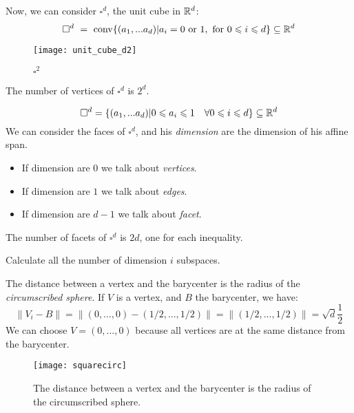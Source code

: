 Now, we can consider $\square^d$, the unit cube in $\mathbb{R}^d$:
\[
   \square^d
   \ = \ 
   \conv\{(a_1,...a_d)|a_i=0\text{ or }1, \text{ for }0\leqslant i\leqslant
   d\}\subseteq\RR^d
\]

\begin{figure}[htbp]
  \centering
  \texttt{[image: unit\_cube\_d2]}
  
  \caption{$\square^2$}
\label{fig:intro:3}
\end{figure}

\begin{obs}
 The number of vertices of $\square^d$ is $2^d$.
\end{obs}

\begin{defn}
 $$\square^d=\left\{(a_1,...a_d)|0\leqslant a_i\leqslant 1 \quad \forall 0\leqslant i\leqslant d\right\}\subseteq\mathbb{R}^d$$
 We can consider the faces of $\square^d$, and his \textit{dimension} are the dimension of his affine span. 
\begin{itemize}
 \item If dimension are $0$ we talk about \textit{vertices}.
 \item If dimension are $1$ we talk about \textit{edges}.
 \item If dimension are $d-1$ we talk about \textit{facet}.
\end{itemize}

\end{defn}

\begin{obs}
 The number of facets of $\square^d$ is $2d$, one for each inequality.
\end{obs}

\begin{exercise}
 Calculate all the number of dimension $i$ subspaces.
\end{exercise}

\begin{obs}
  The distance between a vertex and the barycenter is the radius of the
  \emph{circumscribed sphere}. If $V$ is a vertex, and $B$ the barycenter, we have:
$$\|V_i-B\|=\|(0,...,0)-(1/2,...,1/2)\|=\|(1/2,...,1/2)\|=\sqrt{d}\frac{1}{2}$$
 We can choose $V=(0,...,0)$ because all vertices are at the same distance from the barycenter.

\begin{figure}[htbp]
  \centering
  \texttt{[image: squarecirc]}
  
  \caption{The distance between a vertex and the barycenter is the radius of the circumscribed sphere.}
\label{fig:intro:4}
\end{figure}
\end{obs}

